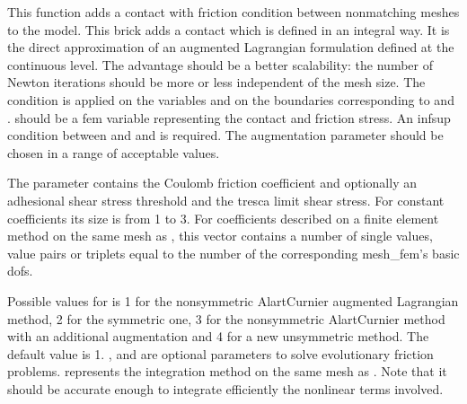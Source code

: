 \documentclass[a4paper,11pt,english]{sphinxmanual}
\begin{document}
This function adds a contact with friction condition between nonmatching meshes
to the model. This brick adds a contact which is defined in an integral way.
It is the direct approximation of an augmented Lagrangian formulation
defined at the continuous level. The advantage should be a better scalability:
the number of Newton iterations should be more or less independent of the mesh size.
The condition is applied on the variables  and 
on the boundaries corresponding to  and .
 should be a fem variable representing the contact and friction stress.
An inf\sphinxhyphen{}sup condition between  and  and
 is required.
The augmentation parameter  should be chosen in a
range of acceptable values.

The parameter  contains the Coulomb friction
coefficient and optionally an adhesional shear stress threshold and the
tresca limit shear stress. For constant coefficients its size is from
1 to 3. For coefficients described on a finite element method on the
same mesh as , this vector contains a number of single values,
value pairs or triplets equal to the number of the corresponding mesh\_fem’s
basic dofs.

Possible values for  is 1 for the non\sphinxhyphen{}symmetric Alart\sphinxhyphen{}Curnier
augmented Lagrangian method, 2 for the symmetric one, 3 for the
non\sphinxhyphen{}symmetric Alart\sphinxhyphen{}Curnier method with an additional augmentation
and 4 for a new unsymmetric method. The default value is 1.
,  and  are optional
parameters to solve evolutionary friction problems.
 represents the integration method on the same mesh as .
Note that it should be accurate enough to integrate efficiently the nonlinear
terms involved.
\end{document}
